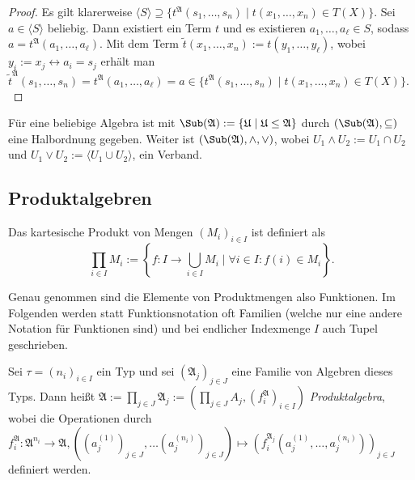 \begin{proof}
    Es gilt klarerweise $\langle S\rangle\supseteq \{t^\mathfrak{A}(s_1,\ldots,s_n)\mid t(x_1,\ldots,x_n)\in T(X)\}$.
    Sei $a\in\langle S\rangle$ beliebig. Dann existiert ein Term $t$ und es existieren $a_1,\ldots,a_\ell\in S$,
    sodass $a=t^\mathfrak{A}(a_1,\ldots,a_\ell)$. Mit dem Term $\tilde{t}(x_1,\ldots,x_n):=t(y_1,\ldots,y_\ell)$, wobei $y_i:=x_j\leftrightarrow a_i=s_j$
    erhält man $\tilde{t}^\mathfrak{A}(s_1,\ldots,s_n)=t^\mathfrak{A}(a_1,\ldots,a_\ell)=a\in\{t^\mathfrak{A}(s_1,\ldots,s_n)\mid t(x_1,\ldots,x_n)\in T(X)\}.$
\end{proof}

\begin{remark}
    Für eine beliebige Algebra ist mit $\Sub(\mathfrak{A}):=\{\mathfrak{U}\mid \mathfrak{U}\le \mathfrak{A}\}$ durch
    $(\Sub(\mathfrak{A}),\subseteq)$ eine Halbordnung gegeben. Weiter ist $(\Sub(\mathfrak{A}),\land,\lor)$,
    wobei $U_1\land U_2:=U_1\cap U_2$ und $U_1\lor U_2:=\langle U_1\cup U_2\rangle$, ein Verband.
\end{remark}

\subsection{Produktalgebren}

\begin{remark}
    Das kartesische Produkt von Mengen $(M_i)_{i \in I}$ ist definiert als 
    $$ \prod_{i \in I} M_i := \left\{f: I \to \bigcup_{i \in I} M_i \mid \forall i \in I: f(i) \in M_i \right\}. $$

    Genau genommen sind die Elemente von Produktmengen also Funktionen. Im Folgenden werden statt Funktionsnotation oft Familien (welche nur eine andere Notation für Funktionen sind) und bei endlicher Indexmenge $I$ auch Tupel geschrieben.
    
\end{remark}

\begin{definition}
    Sei $\tau = (n_i)_{i\in I}$ ein Typ und sei $(\mathfrak{A}_j)_{j\in J}$ eine Familie von Algebren dieses Typs.
    Dann heißt $\mathfrak{A}:=\prod_{j\in J}\mathfrak{A}_j:=(\prod_{j\in J}A_j,(f^\mathfrak{A}_i)_{i\in I})$ \emph{Produktalgebra},
    wobei die Operationen durch $f^\mathfrak{A}_i: \mathfrak{A}^{n_i} \to \mathfrak{A}, ((a_j^{(1)})_{j \in J}, \ldots (a_j^{(n_i)})_{j \in J}) \mapsto (f^{\mathfrak{A}_j}_i(a_j^{(1)}, \ldots, a_j^{(n_i)}))_{j \in J}$
    definiert werden.
\end{definition}

